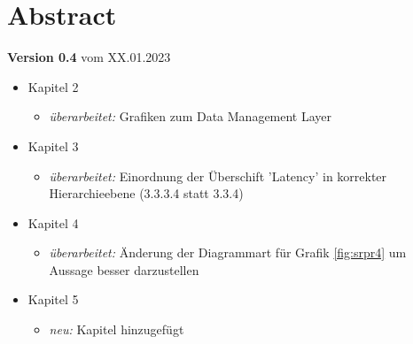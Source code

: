 \cleardoublepage

\chapter*{Abstract}
    
    \large
    \textbf{Version 0.4}
    \normalsize
    vom XX.01.2023 \\
   
   	\begin{itemize}
		\item Kapitel 2
		\begin{itemize}
  			\item \textit{überarbeitet:} Grafiken zum Data Management Layer
		\end{itemize}

		\item Kapitel 3
		\begin{itemize}
  			\item \textit{überarbeitet:} Einordnung der Überschift 'Latency' in korrekter Hierarchieebene (3.3.3.4 statt 3.3.4)
		\end{itemize}
		
		
		\item Kapitel 4
		\begin{itemize}
  			\item \textit{überarbeitet:} Änderung der Diagrammart für Grafik \ref{fig:srpr4} um Aussage besser darzustellen
		\end{itemize}
		
		\item Kapitel 5
		\begin{itemize}
  			\item \textit{neu:} Kapitel hinzugefügt
		\end{itemize} 
	\end{itemize}
